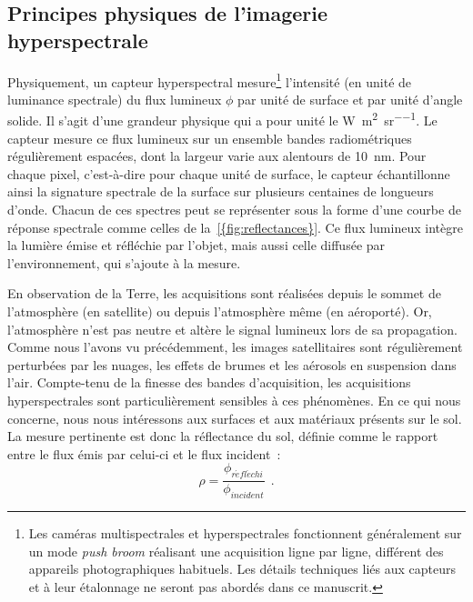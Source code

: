 \subsection{Principes physiques de l'imagerie hyperspectrale}
\label{sec:principes_hsi}

Physiquement, un capteur hyperspectral mesure\footnote{Les caméras multispectrales et hyperspectrales fonctionnent généralement sur un mode \emph{push broom} réalisant une acquisition ligne par ligne, différent des appareils photographiques habituels. Les détails techniques liés aux capteurs et à leur étalonnage ne seront pas abordés dans ce manuscrit.} l'intensité (en unité de luminance spectrale) du flux lumineux $\phi$ par unité de surface et par unité d'angle solide. Il s'agit d'une grandeur physique qui a pour unité le \si{\watt\per\square\meter\per\steradian}. Le capteur mesure ce flux lumineux sur un ensemble bandes radiométriques régulièrement espacées, dont la largeur varie aux alentours de \SI{10}{\nano\meter}. Pour chaque pixel, c'est-à-dire pour chaque unité de surface, le capteur échantillonne ainsi la signature spectrale de la surface sur plusieurs centaines de longueurs d'onde. Chacun de ces spectres peut se représenter sous la forme d'une courbe de réponse spectrale comme celles de la~\cref{{fig:reflectances}}. Ce flux lumineux intègre la lumière émise et réfléchie par l'objet, mais aussi celle diffusée par l'environnement, qui s'ajoute à la mesure.

En observation de la Terre, les acquisitions sont réalisées depuis le sommet de l'atmosphère (en satellite) ou depuis l'atmosphère même (en aéroporté). Or, l'atmosphère n'est pas neutre et altère le signal lumineux lors de sa propagation. Comme nous l'avons vu précédemment, les images satellitaires sont régulièrement perturbées par les nuages, les effets de brumes et les aérosols en suspension dans l'air. Compte-tenu de la finesse des bandes d'acquisition, les acquisitions hyperspectrales sont particulièrement sensibles à ces phénomènes. En ce qui nous concerne, nous nous intéressons aux surfaces et aux matériaux présents sur le sol. La mesure pertinente est donc la réflectance du sol, définie comme le rapport entre le flux émis par celui-ci et le flux incident~:
\begin{equation}
  \rho = \frac{\phi_{\mathit{r\acute{e}fl\acute{e}chi}}}{\phi_\mathit{incident}}~~.
\end{equation}

